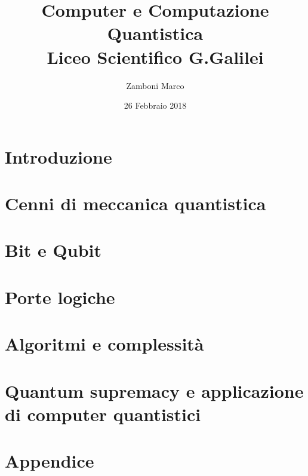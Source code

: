 \documentclass[10pt]{report}
\author{Zamboni Marco}
\date{26 Febbraio 2018}
\title{{Computer e Computazione Quantistica}\\
		{\large Liceo Scientifico G.Galilei}}
\begin{document}

\tableofcontents
\chapter{Introduzione}

\chapter{Cenni di meccanica quantistica}

\chapter{Bit e Qubit}

\chapter{Porte logiche}

\chapter{Algoritmi e complessità}

\chapter{Quantum supremacy e applicazione di computer quantistici}

\appendix
\chapter{Appendice}

\end{document}
